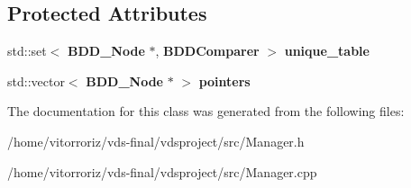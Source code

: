 \subsection*{Protected Attributes}
\begin{DoxyCompactItemize}
\item 
std\+::set$<$ {\bf B\+D\+D\+\_\+\+Node} $\ast$, {\bf B\+D\+D\+Comparer} $>$ {\bfseries unique\+\_\+table}\label{classClassProject_1_1Manager_a74c6fce8db0937f9ddbc0cedd99e5daf}

\item 
std\+::vector$<$ {\bf B\+D\+D\+\_\+\+Node} $\ast$ $>$ {\bfseries pointers}\label{classClassProject_1_1Manager_a829538aaa985c76de340d8f31bbbab80}

\end{DoxyCompactItemize}


The documentation for this class was generated from the following files\+:\begin{DoxyCompactItemize}
\item 
/home/vitorroriz/vds-\/final/vdsproject/src/Manager.\+h\item 
/home/vitorroriz/vds-\/final/vdsproject/src/Manager.\+cpp\end{DoxyCompactItemize}
